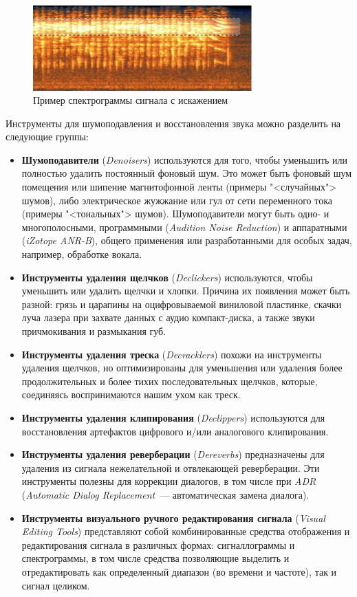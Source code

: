 \documentclass[oneside, final, 14pt]{extreport}
\begin{document}
\begin{figure}[h]
\centering
\includegraphics[width=0.75\textwidth]{pic-distort-01}
\caption{Пример спектрограммы сигнала с искажением}
\label{pic-distort-01}
\end{figure}

Инструменты для шумоподавления и восстановления звука можно разделить на следующие группы:
\begin{itemize}
\item \textbf{Шумоподавители} (\textit{Denoisers}) используются для того, чтобы уменьшить или полностью удалить постоянный фоновый шум. Это может быть фоновый шум помещения или шипение магнитофонной ленты (примеры "<случайных"> шумов), либо электрическое жужжание или гул от сети переменного тока (примеры "<тональных"> шумов). Шумоподавители могут быть одно- и многополосными, программными (\textit{Audition Noise Reduction}) и аппаратными (\textit{iZotope ANR-B}), общего применения или разработанными для особых задач, например, обработке вокала.
\item \textbf{Инструменты удаления щелчков} (\textit{Declickers}) используются, чтобы уменьшить или удалить щелчки и хлопки. Причина их появления может быть разной: грязь и царапины на оцифровываемой виниловой пластинке,  скачки луча лазера при захвате данных с аудио компакт-диска, а также звуки причмокивания и размыкания губ.
\item \textbf{Инструменты удаления треска} (\textit{Decracklers}) похожи на инструменты удаления щелчков, но оптимизированы для уменьшения или удаления более продолжительных и более тихих последовательных щелчков, которые, соединяясь воспринимаются нашим ухом как треск.
\item \textbf{Инструменты удаления клипирования} (\textit{Declippers}) используются для восстановления артефактов цифрового и/или аналогового клипирования.
\item \textbf{Инструменты удаления реверберации} (\emph{Dereverbs}) предназначены для удаления из сигнала нежелательной и отвлекающей реверберации. Эти инструменты полезны для коррекции диалогов, в том числе при \emph{ADR} (\emph{Automatic Dialog Replacement}~--- автоматическая замена диалога).
\item \textbf{Инструменты визуального ручного редактирования сигнала} (\emph{Visual Editing Tools}) представляют собой комбинированные средства отображения и редактирования сигнала в различных формах: сигналлограммы и спектрограммы, в том числе средства позволяющие выделить и отредактировать как определенный диапазон (во времени и частоте), так и сигнал целиком.
\end{itemize}
\end{document}

